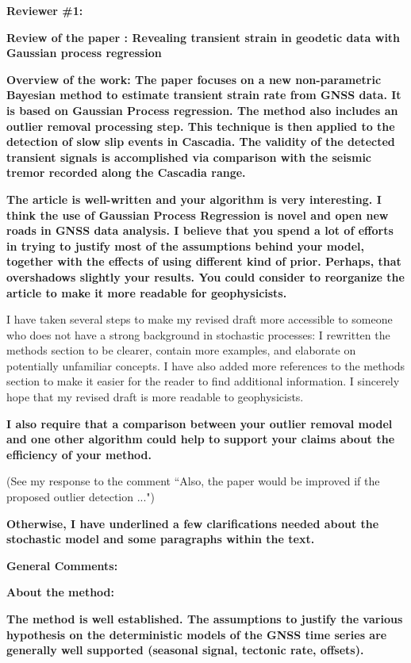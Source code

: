 \documentclass[10pt,a4paper]{letter}
\begin{document}
\begin{letter}{}
\textbf{Reviewer \#1:}\newline

\textbf{Review of the paper : Revealing transient strain in geodetic data
with Gaussian process regression}

\textbf{Overview of the work: The paper focuses on a new non-parametric
Bayesian method to estimate transient strain rate from GNSS data. It
is based on Gaussian Process regression. The method also includes an
outlier removal processing step. This technique is then applied to the
detection of slow slip events in Cascadia. The validity of the
detected transient signals is accomplished via comparison with the
seismic tremor recorded along the Cascadia range.}


\textbf{The article is well-written and your algorithm is very interesting. I
think the use of Gaussian Process Regression is novel and open new
roads in GNSS data analysis. I believe that you spend a lot of efforts
in trying to justify most of the assumptions behind your model,
together with the effects of using different kind of prior. Perhaps,
that overshadows slightly your results. You could consider to
reorganize the article to make it more readable for geophysicists.}

I have taken several steps to make my revised draft more accessible to
someone who does not have a strong background in stochastic processes:
I rewritten the methods section to be clearer, contain more examples,
and elaborate on potentially unfamiliar concepts. I have also added
more references to the methods section to make it easier for the
reader to find additional information. I sincerely hope that my
revised draft is more readable to geophysicists.

\textbf{I also require that a comparison between your outlier removal model
and one other algorithm could help to support your claims about the
efficiency of your method.}

(See my response to the comment ``Also, the paper would be improved if
the proposed outlier detection ...")

\textbf{Otherwise, I have underlined a few clarifications needed about the
stochastic model and some paragraphs within the text.}

\textbf{General Comments:}

\textbf{About the method:}

\textbf{The method is well established. The assumptions to justify the various
hypothesis on the deterministic models of the GNSS time series are
generally well supported (seasonal signal, tectonic rate, offsets).}


\end{letter}
\end{document}
